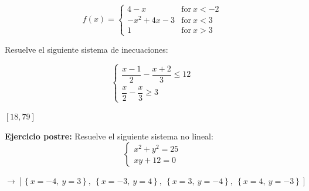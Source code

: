\documentclass[addpoints,spanish, 12pt,a4paper]{exam}
\begin{document}
\begin{questions}
$$f(x)=\begin{cases} 4 - x & \text{for}\: x < -2 \\- x^{2} + 4 x - 3 & \text{for}\: x < 3 \\1 & \text{for}\: x > 3 \end{cases}$$\begin{solution} \end{solution} 
 
 \question Resuelve el siguiente sistema de inecuaciones:
 
 $$\left\{\begin{matrix}\dfrac{{x - 1}}{2} - \dfrac{{x + 2}}{3} \leq 12 \\  \dfrac{x}{2} - \dfrac{x}{3} \geq 3\end{matrix}\right.$$
\begin{solution} $\left[18, 79\right]$ \end{solution}
 
 \question[1] \textbf{Ejercicio postre:} Resuelve el siguiente sistema no lineal: $$\left\{\begin{matrix}x^2 + y^2 = 25 \\ xy+12=0\end{matrix}\right. $$
\begin{solution}
    $ \to \left[ \left\{ x = -4, \  y = 3\right\}, \  \left\{ x = -3, \  y = 4\right\}, \  \left\{ x = 3, \  y = -4\right\}, \  \left\{ x = 4, \  y = -3\right\}\right]$
\end{solution}


\end{questions}
\end{document}
